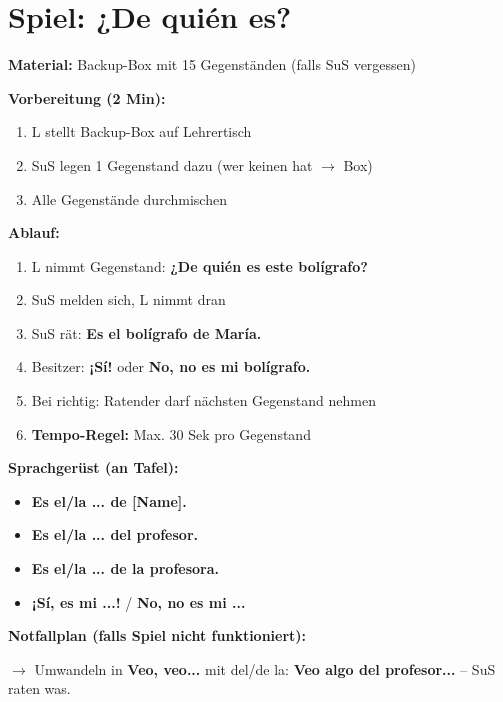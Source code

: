 \documentclass[11pt,a4paper]{article}
\newcommand{\es}[1]{\textbf{#1}}
\begin{document}
\section*{Spiel: ¿De quién es?}

\begin{tcolorbox}[colback=white, colframe=spiel, title=\textcolor{white}{\textbf{Spielablauf (15 Min.)}}]

\textbf{Material:} Backup-Box mit 15 Gegenständen (falls SuS vergessen)

\vspace{0.3cm}

\textbf{Vorbereitung (2 Min):}
\begin{enumerate}[nosep]
    \item L stellt Backup-Box auf Lehrertisch
    \item SuS legen 1 Gegenstand dazu (wer keinen hat $\rightarrow$ Box)
    \item Alle Gegenstände durchmischen
\end{enumerate}

\vspace{0.3cm}

\textbf{Ablauf:}
\begin{enumerate}[nosep]
    \item L nimmt Gegenstand: \es{¿De quién es este bolígrafo?}
    \item SuS melden sich, L nimmt dran
    \item SuS rät: \es{Es el bolígrafo de María.}
    \item Besitzer: \es{¡Sí!} oder \es{No, no es mi bolígrafo.}
    \item Bei richtig: Ratender darf nächsten Gegenstand nehmen
    \item \textbf{Tempo-Regel:} Max. 30 Sek pro Gegenstand
\end{enumerate}

\vspace{0.3cm}

\textbf{Sprachgerüst (an Tafel):}
\begin{itemize}[nosep]
    \item \es{Es el/la ... de [Name].}
    \item \es{Es el/la ... del profesor.}
    \item \es{Es el/la ... de la profesora.}
    \item \es{¡Sí, es mi ...!} / \es{No, no es mi ...}
\end{itemize}

\vspace{0.3cm}

\textbf{Notfallplan (falls Spiel nicht funktioniert):}

$\rightarrow$ Umwandeln in \es{Veo, veo...} mit del/de la:
\es{Veo algo del profesor...} -- SuS raten was.

\end{tcolorbox}
\end{document}
